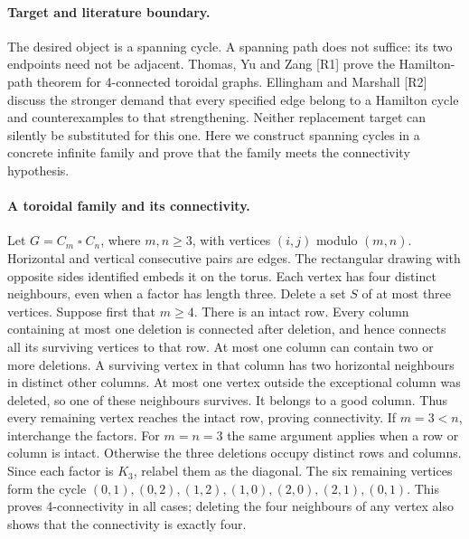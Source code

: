 \documentclass[11pt,a4paper]{article}
\begin{document}
\paragraph{Target and literature boundary.}
The desired object is a spanning cycle. A spanning path does not suffice:
its two endpoints need not be adjacent. Thomas, Yu and Zang [R1] prove
the Hamilton-path theorem for 4-connected toroidal graphs. Ellingham
and Marshall [R2] discuss the stronger demand that every specified edge
belong to a Hamilton cycle and counterexamples to that strengthening.
Neither replacement target can silently be substituted for this one.
Here we construct spanning cycles in a concrete infinite family and prove
that the family meets the connectivity hypothesis.

\paragraph{A toroidal family and its connectivity.}
Let $G=C_m\mathbin\square C_n$, where $m,n\ge3$, with vertices
$(i,j)$ modulo $(m,n)$. Horizontal and vertical consecutive pairs are
edges. The rectangular drawing with opposite sides identified embeds it
on the torus. Each vertex has four distinct neighbours, even when a
factor has length three.
Delete a set $S$ of at most three vertices. Suppose first that $m\ge4$.
There is an intact row. Every column containing at most one deletion
is connected after deletion, and hence connects all its surviving
vertices to that row. At most one column can contain two or more
deletions. A surviving vertex in that column has two horizontal
neighbours in distinct other columns. At most one vertex outside the
exceptional column was deleted, so one of these neighbours survives.
It belongs to a good column. Thus every remaining vertex reaches the
intact row, proving connectivity. If $m=3<n$, interchange the factors.
For $m=n=3$ the same argument applies when a row or column is intact.
Otherwise the three deletions occupy distinct rows and columns. Since
each factor is $K_3$, relabel them as the diagonal. The six remaining
vertices form the cycle
$(0,1),(0,2),(1,2),(1,0),(2,0),(2,1),(0,1)$.
This proves 4-connectivity in all cases; deleting the four neighbours
of any vertex also shows that the connectivity is exactly four.
\end{document}
